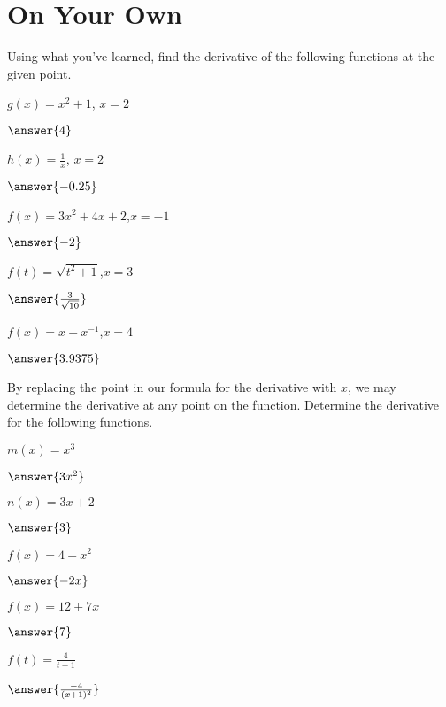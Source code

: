 \documentclass{ximera}
\begin{document}
\section{On Your Own}
Using what you've learned, find the derivative of the following functions at the given point.
\setcounter{problem}{0}
\begin{question}
$g(x) = x^2+1$, $x=2$

$\answer{4}$

$h(x) = \frac{1}{x}$, $x=2$

$\answer{-0.25}$

$f(x)=3x^2+4x+2$,$x=-1$

$\answer{-2}$

\item{$f(t)=\sqrt{t^2+1}$,$x=3$}

$\answer{\frac{3}{\sqrt{10}}}$

\item{$f(x) = x+x^{-1}$,$x=4$}

$\answer{3.9375}$

\end{question}

By replacing the point in our formula for the derivative with $x$, we may determine the derivative at any point on the function. Determine the derivative for the following functions.
\begin{question}
$m(x) = x^3$

$\answer{3x^2}$

$n(x) = 3x+2$

$\answer{3}$

$f(x)=4-x^2$

$\answer{-2x}$

$f(x) = 12+7x$

$\answer{7}$

$f(t)=\frac{4}{t+1}$

$\answer{\frac{-4}{(x+1)^2}}$

\end{question}
\end{document}
